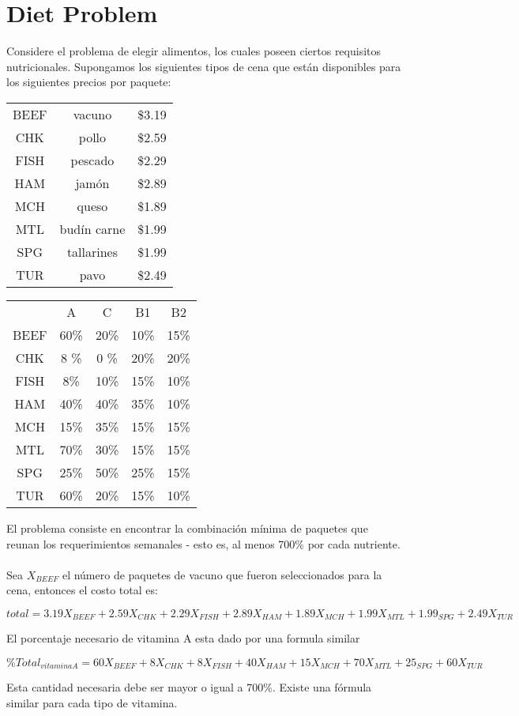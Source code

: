 \documentclass[11pt]{article}
\begin{document}
\section*{Diet Problem}
Considere el problema de elegir alimentos, los cuales poseen ciertos requisitos nutricionales. Supongamos los siguientes tipos de cena que están disponibles para los siguientes precios por paquete:

\begin{multicols}{2}

\begin{center}\begin{tabular}{ccc}
	BEEF & vacuno & \$3.19\\
	CHK & pollo &\$2.59 \\
	FISH & pescado &\$2.29\\
	HAM & jamón & \$2.89\\
	MCH & queso & \$1.89\\
	MTL & budín carne & \$1.99\\
	SPG & tallarines & \$1.99\\
	TUR & pavo & \$2.49\\
\end{tabular}\end{center}

\begin{multicols}{2}
\end{multicols}
\begin{center}\begin{tabular}{ccccc}
		&A &C &B1 &B2 \\
	BEEF& 60\% &20\% &10\%&15\%\\
	CHK & 8 \% &0 \% &20\%&20\%\\
	FISH & 8\% &10\% &15\%&10\%\\
	HAM & 40\% &40\% &35\%&10\%\\
	MCH & 15\% &35\% &15\%&15\%\\
	MTL & 70\% &30\% &15\%&15\%\\
	SPG & 25\% &50\% &25\%&15\%\\
	TUR & 60\% &20\% &15\%&10\%\\
\end{tabular}\end{center}
\end{multicols}
El problema consiste en encontrar la combinación mínima de paquetes que reunan los requerimientos semanales - esto es, al menos 700\% por cada nutriente.\\\\Sea $X_{BEEF}$ el número de paquetes de vacuno que fueron seleccionados para la cena, entonces el costo total es:
\begin{center}$total = 3.19X_{BEEF}+2.59X_{CHK}+2.29X_{FISH}+2.89X_{HAM}+1.89X_{MCH}+1.99X_{MTL}+1.99_{SPG}+2.49X_{TUR}$
\end{center}
El porcentaje necesario de vitamina A esta dado por una formula similar
\begin{center}$\%Total_{vitamina A}=60X_{BEEF}+8X_{CHK}+8X_{FISH}+40X_{HAM}+15X_{MCH}+70X_{MTL}+25_{SPG}+60X_{TUR}$\end{center}
Esta cantidad necesaria debe ser mayor o igual a 700\%. Existe una fórmula similar para cada tipo de vitamina.
\newpage
\end{document}
